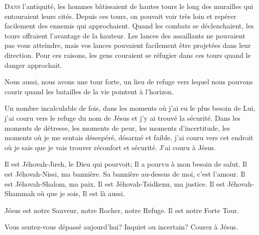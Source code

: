 





\lettrine{D}{ans} l'antiquité, les hommes bâtissaient de hautes tours
 le long des murailles qui entouraient leurs cités.
 Depuis ces tours, on pouvait voir très loin et
 repérer facilement des ennemis qui approchaient.
 Quand les combats se déclenchaient, les tours offraient
 l'avantage de la hauteur. Les lances des assaillants
 ne pouvaient pas vous atteindre,
 mais vos lances pouvaient facilement être projetées dans
 leur direction.
 Pour ces raisons, les gens couraient se réfugier dans ces tours
 quand le danger approchait. 

Nous aussi, nous avons une tour forte, un lieu de refuge vers lequel
 nous pouvons courir quand les batailles de la vie pointent
 à l'horizon. 


Un nombre incalculable de fois,
 dans les moments où j'ai eu le plus besoin de Lui,
 j'ai couru vers le refuge du nom de Jésus
 et j'y ai trouvé la sécurité.
 Dans les moments de détresse, les moments de peur,
 les moments d'incertitude, les moments où je me sentais désespéré,
 désarmé et faible, j'ai couru vers cet endroit où je sais
 que je vais trouver réconfort et sécurité. J'ai couru à Jésus. 

Il est Jéhovah-Jireh, le Dieu qui pourvoit; Il 
 a pourvu à mon besoin de salut. Il est Jéhovah-Nissi, ma bannière.
 Sa bannière au-dessus de moi, c'est l'amour. Il est Jéhovah-Shalom, 
 ma paix. Il est Jéhovah-Tsidkenu, ma justice. Il est Jéhovah-Shammah 
 \ocadr où que je sois, Il est là aussi. 

Jésus est notre Sauveur, notre Rocher, notre Refuge. Il est notre Forte Tour. 

Vous sentez-vous dépassé aujourd'hui? Inquiet 
 ou incertain? Courez à Jésus. 

\dvrule

